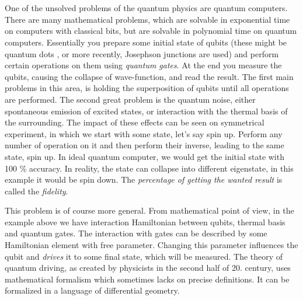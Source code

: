 \chapter*{}
One of the unsolved problems of the quantum physics are quantum computers. There are many mathematical problems, which are solvable in exponential time on computers with classical bits, but are solvable in polynomial time on quantum computers. Essentially you prepare some initial state of qubits (these might be quantum dots \citep{dots}, or more recently, Josephson junctions \citep{josephson} are used) and perform certain operations on them using \emph{quantum gates}. At the end you measure the qubits, causing the collapse of wave-function, and read the result. The first main problems in this area, is holding the superposition of qubits until all operations are performed. The second great problem is the quantum noise, either spontaneous emission of excited states, or interaction with the thermal basis of the surrounding. The impact of these effects can be seen on symmetrical experiment, in which we start with some state, let's say spin up. Perform any number of operation on it and then perform their inverse, leading to the same state, spin up. In ideal quantum computer, we would get the initial state with 100 \% accuracy. In reality, the state can collapse into different eigenstate, in this example it would be spin down. The \emph{percentage of getting the wanted result} is called the \emph{fidelity}.

This problem is of course more general. From mathematical point of view, in the example above we have interaction Hamiltonian between qubits, thermal basis and quantum gates. The interaction with gates can be described by some Hamiltonian element with free parameter. Changing this parameter influences the qubit and \emph{drives} it to some final state, which will be measured. The theory of quantum driving, as created by physicists in the second half of 20. century, uses mathematical formalism which sometimes lacks on precise definitions. It can be formalized in a language of differential geometry. 

